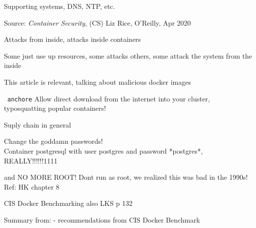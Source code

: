 \documentclass[Screen16to9,17pt]{foils}
\begin{document}
Supporting systems, DNS, NTP, etc.





Source: \emph{Container Security}, (CS) Liz Rice, O'Reilly, Apr 2020

\begin{list2}
\item Attacks from inside, attacks inside containers
\item Some just use up resources, some attacks others, some attack the system from the inside
\end{list2}


This article is relevant, talking about malicious docker images\\


\begin{list2}
\item \faWrench\ \verb+anchore+
Allow direct download from the internet into your cluster, typosquatting popular containers!

\item Suply chain in general
\end{list2}


\begin{list2}
\item Change the goddamn passwords!\\
Container postgresql with user postgres and password *postgres*, REALLY!!!!!!1111

\item and NO MORE ROOT! Dont run as root, we realized this was bad in the 1990s!
Ref: HK chapter 8

\item CIS Docker Benchmarking also LKS p 132
\end{list2}

\slide{}

Summary from:  - recommendations from CIS Docker Benchmark
\end{document}
